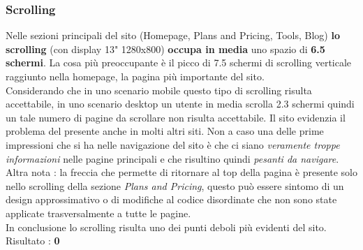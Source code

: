 \subsubsection{Scrolling}\label{scrolling}
Nelle sezioni principali del sito (Homepage, Plans and Pricing, Tools, Blog) 
\textbf{lo scrolling} (con display 13" 1280x800) \textbf{occupa in media} uno spazio di 
\textbf{6.5 schermi}. La cosa più preoccupante è il picco di 7.5 schermi di 
scrolling verticale raggiunto nella homepage, la pagina più importante del sito. \\
Considerando che in uno scenario mobile questo tipo di scrolling
risulta accettabile, in uno scenario desktop un utente in media scrolla 2.3 schermi
quindi un tale numero di pagine da scrollare non risulta accettabile. 
Il sito evidenzia il problema del
 presente anche in molti altri siti. 
Non a caso una delle prime impressioni che si ha nelle 
navigazione del sito è che ci siano \textit{veramente troppe informazioni} 
nelle pagine principali e che risultino quindi \textit{pesanti da navigare}. \\
Altra nota : la freccia che permette di ritornare al top della 
pagina è presente solo nello scrolling della sezione \textit{Plans and Pricing},
questo può essere sintomo di un design approssimativo o di modifiche al codice
disordinate che non sono state applicate trasversalmente a tutte le pagine. \\
In conclusione lo scrolling risulta uno dei punti deboli più evidenti
del sito. \\
Risultato : \textbf{0}
